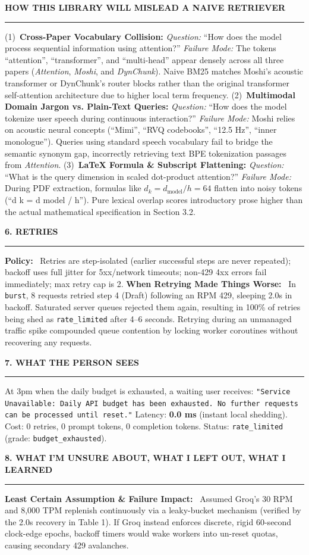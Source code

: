 \documentclass[10pt,a4paper]{article}
\newcommand{\secheader}[1]{\vspace{0.2em}\noindent\textbf{\small\MakeUppercase{#1}}\vspace{0.05em}\par\hrule\vspace{0.12em}}
\newcommand{\subhead}[1]{\noindent\textbf{#1}\ }
\begin{document}
\secheader{How This Library Will Mislead a Naive Retriever}
(1)~\textbf{Cross-Paper Vocabulary Collision:}
\textit{Question:} ``How does the model process sequential information using attention?''
\textit{Failure Mode:} The tokens ``attention'', ``transformer'', and ``multi-head'' appear densely across all three papers (\textit{Attention}, \textit{Moshi}, and \textit{DynChunk}). Naive BM25 matches Moshi's acoustic transformer or DynChunk's router blocks rather than the original transformer self-attention architecture due to higher local term frequency.
(2)~\textbf{Multimodal Domain Jargon vs. Plain-Text Queries:}
\textit{Question:} ``How does the model tokenize user speech during continuous interaction?''
\textit{Failure Mode:} Moshi relies on acoustic neural concepts (``Mimi'', ``RVQ codebooks'', ``12.5 Hz'', ``inner monologue''). Queries using standard speech vocabulary fail to bridge the semantic synonym gap, incorrectly retrieving text BPE tokenization passages from \textit{Attention}.
(3)~\textbf{LaTeX Formula \& Subscript Flattening:}
\textit{Question:} ``What is the query dimension in scaled dot-product attention?''
\textit{Failure Mode:} During PDF extraction, formulas like $d_k = d_{\text{model}} / h = 64$ flatten into noisy tokens (``d k = d model / h''). Pure lexical overlap scores introductory prose higher than the actual mathematical specification in Section 3.2.

\secheader{6. Retries}
\subhead{Policy:} Retries are step-isolated (earlier successful steps are never repeated); backoff uses full jitter for 5xx/network timeouts; non-429 4xx errors fail immediately; max retry cap is 2.
\subhead{When Retrying Made Things Worse:} In \texttt{burst}, 8 requests retried step 4 (Draft) following an RPM 429, sleeping 2.0s in backoff. Saturated server queues rejected them again, resulting in 100\% of retries being shed as \texttt{rate\_limited} after 4–6 seconds. Retrying during an unmanaged traffic spike compounded queue contention by locking worker coroutines without recovering any requests.

\secheader{7. What the Person Sees}
At 3pm when the daily budget is exhausted, a waiting user receives:
\texttt{"Service Unavailable: Daily API budget has been exhausted. No further requests can be processed until reset."}
Latency: \textbf{0.0 ms} (instant local shedding). Cost: 0 retries, 0 prompt tokens, 0 completion tokens. Status: \texttt{rate\_limited} (grade: \texttt{budget\_exhausted}).

\secheader{8. What I'm Unsure About, What I Left Out, What I Learned}
\subhead{Least Certain Assumption \& Failure Impact:}
Assumed Groq's 30 RPM and 8,000 TPM replenish continuously via a leaky-bucket mechanism (verified by the 2.0s recovery in Table 1). If Groq instead enforces discrete, rigid 60-second clock-edge epochs, backoff timers would wake workers into un-reset quotas, causing secondary 429 avalanches.
\end{document}
